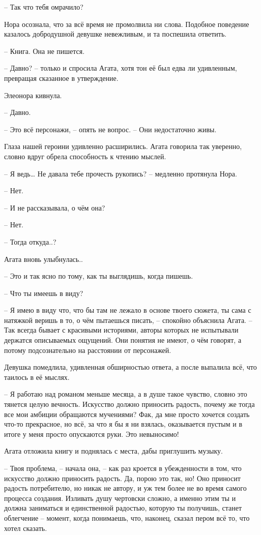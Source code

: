 \documentclass[
  a5paperpaper,
  DIV=11,
  numbers=noendperiod]{scrreprt}
\begin{document}
-- Так что тебя омрачило?

Нора осознала, что за всё время не промолвила ни слова. Подобное
поведение казалось добродушной девушке невежливым, и та поспешила
ответить.

-- Книга. Она не пишется.

-- Давно? -- только и спросила Агата, хотя тон её был едва ли
удивленным, превращая сказанное в утверждение.

Элеонора кивнула.

-- Давно.

-- Это всё персонажи, -- опять не вопрос. -- Они недостаточно живы.

Глаза нашей героини удивленно расширились. Агата говорила так уверенно,
словно вдруг обрела способность к чтению мыслей.

-- Я ведь\ldots{} Не давала тебе прочесть рукопись? -- медленно
протянула Нора.

-- Нет.

-- И не рассказывала, о чём она?

-- Нет.

-- Тогда откуда..?

Агата вновь улыбнулась..

-- Это и так ясно по тому, как ты выглядишь, когда пишешь.

-- Что ты имеешь в виду?

-- Я имею в виду что, что бы там не лежало в основе твоего сюжета, ты
сама с натяжкой веришь в то, о чём пытаешься писать, -- спокойно
объяснила Агата. -- Так всегда бывает с красивыми историями, авторы
которых не испытывали держатся описываемых ощущений. Они понятия не
имеют, о чём говорят, а потому подсознательно на расстоянии от
персонажей.

Девушка помедлила, удивленная обширностью ответа, а после выпалила всё,
что таилось в её мыслях.

-- Я работаю над романом меньше месяца, а в душе такое чувство, словно
это тянется целую вечность. Искусство должно приносить радость, почему
же тогда все мои амбиции обращаются мучениями? Фак, да мне просто
хочется создать что-то прекрасное, но всё, за что я бы я ни взялась,
оказывается пустым и в итоге у меня просто опускаются руки. Это
невыносимо!

Агата отложила книгу и поднялась с места, дабы приглушить музыку.

-- Твоя проблема, -- начала она, -- как раз кроется в убежденности в
том, что искусство должно приносить радость. Да, порою это так, но! Оно
приносит радость потребителю, но никак не автору, и уж тем более не во
время самого процесса создания. Изливать душу чертовски сложно, а именно
этим ты и должна заниматься и единственной радостью, которую ты
получишь, станет облегчение -- момент, когда понимаешь, что, наконец,
сказал пером всё то, что хотел сказать.
\end{document}
